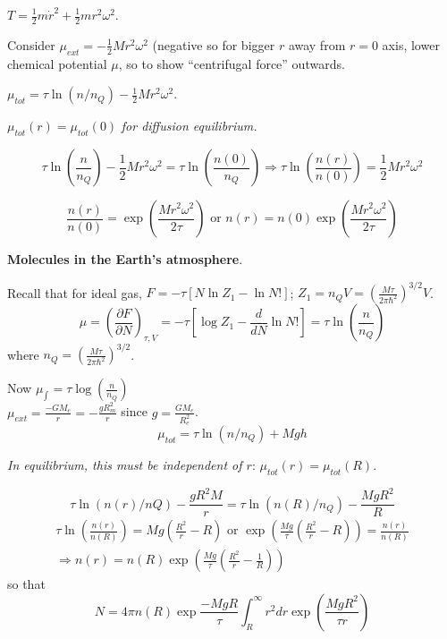 $T = \frac{1}{2} m \dot{r}^2 + \frac{1}{2} m r^2 \omega^2$.

Consider $\mu_{ext} = - \frac{1}{2} M r^2 \omega^2$  (negative so for bigger $r$ away from $r=0$ axis, lower chemical potential $\mu$, so to show ``centrifugal force'' outwards.  

$\mu_{tot} = \tau \ln{ (n/n_Q)} - \frac{1}{2} M r^2 \omega^2$.  

$\mu_{tot}(r) = \mu_{tot}(0)$ \emph{for diffusion equilibrium.}

\[
\tau \ln{\left( \frac{ n }{n_Q} \right)} - \frac{1}{2} M r^2 \omega^2 = \tau \ln{ \left( \frac{n(0)}{n_Q} \right)} \Longrightarrow \tau \ln{ \left( \frac{n(r)}{n(0)} \right) } =  \frac{1}{2} M r^2 \omega^2
\]

\[
\frac{n(r)}{n(0)} = \exp{ \left( \frac{Mr^2 \omega^2}{ 2\tau} \right) } \text{ or } \boxed{ n(r) = n(0) \exp{ \left( \frac{Mr^2 \omega^2}{2\tau} \right) } }
\]



 \textbf{Molecules in the Earth's atmosphere}.

Recall that for ideal gas, $F = - \tau [ N \ln{Z_1} - \ln{N!} ]$; $Z_1 = n_Q V = \left( \frac{ M \tau}{2\pi \hbar^2} \right)^{3/2} V$.  
\[
\mu = \left( \frac{ \partial F}{ \partial N} \right)_{\tau, V} = -\tau [ \log{Z_1} - \frac{d}{dN} \ln{N!} ] = \tau \ln{ \left( \frac{n}{n_Q} \right) }
\]
where $n_Q = \left( \frac{ M \tau}{2\pi \hbar^2} \right)^{3/2}$.

Now
$\mu_{\int} = \tau \log{ \left( \frac{n}{n_Q} \right)}$ \\
$\mu_{ext} = \frac{ - GM_e}{r} =  - \frac{ gR^2_m}{ r}$ since $g = \frac{ GM_e}{R_e^2}$.  
\[
\mu_{tot} = \tau \ln{ (n/n_Q)} + Mgh
\]

\emph{In equilibrium, this must be independent of $r$}: $\mu_{tot}(r) = \mu_{tot}(R)$.  

\[
\tau \ln{ ( n(r)/nQ)} - \frac{ gR^2 M }{r} = \tau \ln{ ( n(R)/n_Q) } - \frac{ MgR^2}{R}
\]
\[
\begin{gathered}
  \tau \ln{ \left( \frac{n(r)}{ n(R)} \right) } = Mg \left( \frac{R^2}{r} - R \right) \text{ or } \exp{ \left( \frac{Mg}{\tau} \left( \frac{R^2}{r} - R \right) \right) } = \frac{n(r)}{n(R)} \\ 
  \Longrightarrow n(r) = n(R) \exp{ \left( \frac{Mg}{ \tau} \left( \frac{R^2}{r} - \frac{1}{R} \right)\right)}
\end{gathered}
\]
so that 
\[
\boxed{ N = 4\pi n(R) \exp{ \frac{ - MgR}{\tau} \int_R^{\infty} r^2 dr \exp{ \left( \frac{Mg R^2}{\tau r } \right) } } }
\]



